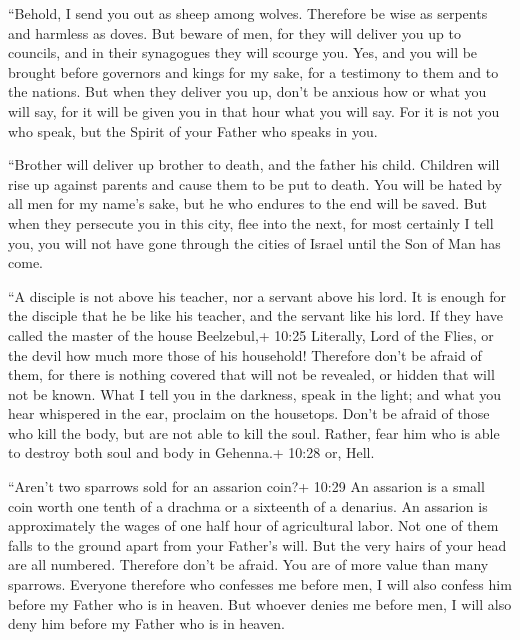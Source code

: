 ``Behold, I send you out as sheep among wolves. Therefore
be wise as serpents and harmless as doves.  But beware of
men, for they will deliver you up to councils, and in their synagogues
they will scourge you.  Yes, and you will be brought before
governors and kings for my sake, for a testimony to them and to the
nations.  But when they deliver you up, don't be anxious
how or what you will say, for it will be given you in that hour what you
will say.  For it is not you who speak, but the Spirit of
your Father who speaks in you.

 ``Brother will deliver up brother to death, and the father
his child. Children will rise up against parents and cause them to be
put to death.  You will be hated by all men for my name's
sake, but he who endures to the end will be saved.  But
when they persecute you in this city, flee into the next, for most
certainly I tell you, you will not have gone through the cities of
Israel until the Son of Man has come.

 ``A disciple is not above his teacher, nor a servant above
his lord.  It is enough for the disciple that he be like
his teacher, and the servant like his lord. If they have called the
master of the house Beelzebul,+ 10:25 Literally, Lord of the Flies, or
the devil how much more those of his household!  Therefore
don't be afraid of them, for there is nothing covered that will not be
revealed, or hidden that will not be known.  What I tell
you in the darkness, speak in the light; and what you hear whispered in
the ear, proclaim on the housetops.  Don't be afraid of
those who kill the body, but are not able to kill the soul. Rather, fear
him who is able to destroy both soul and body in Gehenna.+ 10:28 or,
Hell.

 ``Aren't two sparrows sold for an assarion coin?+ 10:29 An
assarion is a small coin worth one tenth of a drachma or a sixteenth of
a denarius. An assarion is approximately the wages of one half hour of
agricultural labor. Not one of them falls to the ground apart from your
Father's will.  But the very hairs of your head are all
numbered.  Therefore don't be afraid. You are of more value
than many sparrows.  Everyone therefore who confesses me
before men, I will also confess him before my Father who is in heaven.
 But whoever denies me before men, I will also deny him
before my Father who is in heaven.

